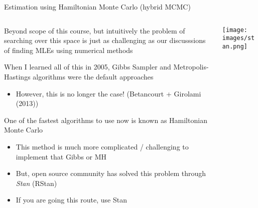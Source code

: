 \documentclass[notes,11pt, aspectratio=169]{beamer}
\newenvironment{wideitemize}{\itemize\addtolength{\itemsep}{10pt}}{\enditemize}
\begin{document}
\begin{frame}{Estimation using Hamiltonian Monte Carlo (hybrid MCMC)}
  \begin{columns}[T] %
    \begin{column}{.7\textwidth}
  \begin{wideitemize}
  \item Beyond scope of this course, but intuitively the problem of
    searching over this space is just as challenging as our
    discusssions of finding MLEs using numerical methods
  \item When I learned all of this in 2005, Gibbs Sampler and
    Metropolis-Hastings algorithms were the default approaches
    \begin{itemize}
    \item However, this is no longer the case! (Betancourt + Girolami
      (2013))
    \end{itemize}
  \item One of the fastest algorithms to use now is known as
    Hamiltonian Monte Carlo
    \begin{itemize}
    \item This method is much more complicated / challenging to implement that Gibbs or MH
    \item But, open source community has solved this problem through \textit{Stan} (RStan)
    \item If you are going this route, use Stan
    \end{itemize}
  \end{wideitemize}
\end{column}
\begin{column}{0.3\textwidth}
  \texttt{[image: images/stan.png]}
\end{column}
\end{columns}
\end{frame}
\end{document}
